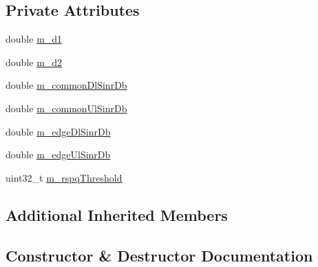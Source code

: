 \subsection*{Private Attributes}
\begin{DoxyCompactItemize}
\item 
double \hyperlink{classLteInterferenceStrictFrTestCase_a0ad0c27ec563dbace40fe0deb0f104e0}{m\+\_\+d1}
\item 
double \hyperlink{classLteInterferenceStrictFrTestCase_abbc5236155c073bca8f45049c2d2d9df}{m\+\_\+d2}
\item 
double \hyperlink{classLteInterferenceStrictFrTestCase_a2f4263af737109fdd03c694bec8c9a4a}{m\+\_\+common\+Dl\+Sinr\+Db}
\item 
double \hyperlink{classLteInterferenceStrictFrTestCase_a79c4fa199896a47ae7aaadedd32f1cbb}{m\+\_\+common\+Ul\+Sinr\+Db}
\item 
double \hyperlink{classLteInterferenceStrictFrTestCase_a7c49444df9eb531272ca4e8f87bdf2b3}{m\+\_\+edge\+Dl\+Sinr\+Db}
\item 
double \hyperlink{classLteInterferenceStrictFrTestCase_a3ac33b24f887f20f176f2a6667fe7af1}{m\+\_\+edge\+Ul\+Sinr\+Db}
\item 
uint32\+\_\+t \hyperlink{classLteInterferenceStrictFrTestCase_a114a0478eab1d57168b018eb23c9cfba}{m\+\_\+rspq\+Threshold}
\end{DoxyCompactItemize}
\subsection*{Additional Inherited Members}


\subsection{Constructor \& Destructor Documentation}
